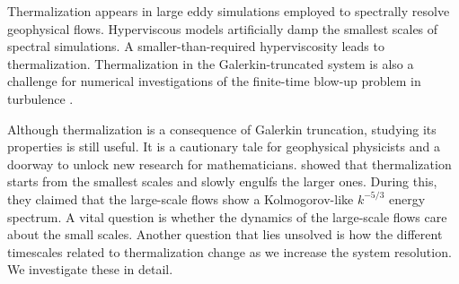 \documentclass[../Rajarshi-thesis-draft.tex]{subfiles}
\begin{document}
Thermalization appears in large eddy simulations employed to spectrally resolve geophysical flows. Hyperviscous models artificially damp the smallest scales of spectral simulations. A smaller-than-required hyperviscosity leads to thermalization. Thermalization in the Galerkin-truncated system is also a challenge for numerical investigations of the finite-time blow-up problem in turbulence \cite{bustamante2012}.


Although thermalization is a consequence of Galerkin truncation, studying its properties is still useful. It is a cautionary tale for geophysical physicists and a doorway to unlock new research for mathematicians. \citet{cichowlas2005} showed that thermalization starts from the smallest scales and slowly engulfs the larger ones. During this, they claimed that the large-scale flows show a Kolmogorov-like $k^{-5/3}$ energy spectrum. A vital question is whether the dynamics of the large-scale flows care about the small scales. Another question that lies unsolved is how the different timescales related to thermalization change as we increase the system resolution. We investigate these in detail. 
  



\end{document}
